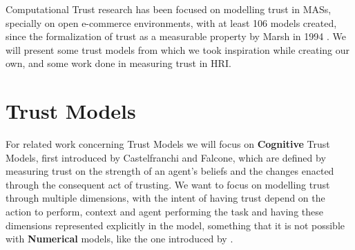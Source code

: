 \label{chap:RelatedWork}

Computational Trust research has been focused on modelling trust in \acp{MAS}, specially on open e-commerce environments\cite{Granatyr2015, HanYu2013, Pinyol2013, Noorian2010, Huang2008}, with at least 106 models created\cite{Granatyr2015}, since the formalization of trust as a measurable property by Marsh in 1994 \cite{Marsh1994}. We will present some trust models from which we took inspiration while creating our own, and some work done in measuring trust in \ac{HRI}.

\section{Trust Models}
\label{sec:Related work:Trust Models}
For related work concerning Trust Models we will focus on \textbf{Cognitive} Trust Models, first introduced by Castelfranchi and Falcone\cite{Castelfranchi1998}, which are defined by measuring trust on the strength of an agent's beliefs and the changes enacted through the consequent act of trusting. We want to focus on modelling trust through multiple dimensions, with the intent of having trust depend on the action to perform, context and agent performing the task and having these dimensions represented explicitly in the model, something that it is not possible with \textbf{Numerical} models, like the one introduced by \cite{Marsh1994}. 


